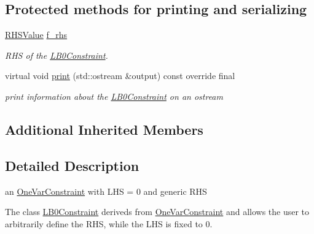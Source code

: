 \subsection*{Protected methods for printing and serializing}
\begin{DoxyCompactItemize}
\item 
\mbox{\label{class_s_m_spp__di__unipi__it_1_1_l_b0_constraint_ac41d0fab1f795d45c50f5f342d9d5240}} 
\mbox{\hyperlink{class_s_m_spp__di__unipi__it_1_1_row_constraint_a8813536ab3b13a81c8e83a999ade3bd8}{R\+H\+S\+Value}} \mbox{\hyperlink{class_s_m_spp__di__unipi__it_1_1_l_b0_constraint_ac41d0fab1f795d45c50f5f342d9d5240}{f\+\_\+rhs}}
\begin{DoxyCompactList}\small\item\em R\+HS of the \mbox{\hyperlink{class_s_m_spp__di__unipi__it_1_1_l_b0_constraint}{L\+B0\+Constraint}}. \end{DoxyCompactList}\item 
\mbox{\label{class_s_m_spp__di__unipi__it_1_1_l_b0_constraint_a617885c1d228e0ca67bbb0efdbe713e3}} 
virtual void \mbox{\hyperlink{class_s_m_spp__di__unipi__it_1_1_l_b0_constraint_a617885c1d228e0ca67bbb0efdbe713e3}{print}} (std\+::ostream \&output) const override final
\begin{DoxyCompactList}\small\item\em print information about the \mbox{\hyperlink{class_s_m_spp__di__unipi__it_1_1_l_b0_constraint}{L\+B0\+Constraint}} on an ostream \end{DoxyCompactList}\end{DoxyCompactItemize}
\subsection*{Additional Inherited Members}


\subsection{Detailed Description}
an \mbox{\hyperlink{class_s_m_spp__di__unipi__it_1_1_one_var_constraint}{One\+Var\+Constraint}} with L\+HS = 0 and generic R\+HS 

The class \mbox{\hyperlink{class_s_m_spp__di__unipi__it_1_1_l_b0_constraint}{L\+B0\+Constraint}} deriveds from \mbox{\hyperlink{class_s_m_spp__di__unipi__it_1_1_one_var_constraint}{One\+Var\+Constraint}} and allows the user to arbitrarily define the R\+HS, while the L\+HS is fixed to 0. 

